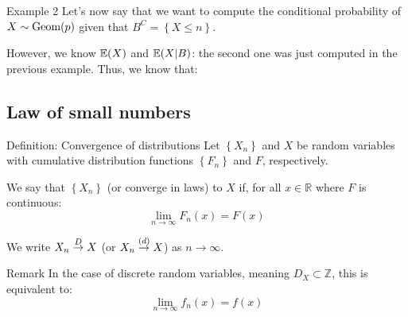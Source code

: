 \documentclass[a4paper]{article}
\begin{document}
\begin{parag}{Example 2}
    Let's now say that we want to compute the conditional probability of $X \followsdistr \text{Geom}\left(p\right)$ given that $B^C = \left\{X \leq n\right\}$.

    However, we know $\exval\left(X\right)$ and $\exval\left(X | B\right)$: the second one was just computed in the previous example. Thus, we know that: 
\end{parag}

\subsection{Law of small numbers}
\begin{parag}{Definition: Convergence of distributions}
    Let $\left\{X_n\right\}$ and $X$ be random variables with cumulative distribution functions $\left\{F_n\right\}$ and $F$, respectively.

    We say that $\left\{X_n\right\}$  (or converge in laws) to $X$ if, for all $x \in \mathbb{R}$ where $F$ is continuous: 
    \[\lim_{n \to \infty} F_n\left(x\right) = F\left(x\right)\]
    
    We write $X_n \over{\to}{$D$} X$ (or $X_n \over{\to}{$\left(d\right)$} X$) as $n \to \infty$.

    \begin{subparag}{Remark}
        In the case of discrete random variables, meaning $D_X \subset \mathbb{Z}$, this is equivalent to: 
        \[\lim_{n \to \infty} f_n\left(x\right) = f\left(x\right)\]
    \end{subparag}
\end{parag}
\end{document}
